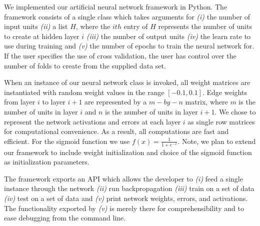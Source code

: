 We implemented our artificial neural network framework in Python.
The framework consists of a single class which takes arguments for {\em (i)} the number of input units {\em (ii)} a list \(H\), where the \(ith\) entry of \(H\) represents the number of units to create at hidden layer \(i\) {\em (iii)} the number of output units {\em (iv)} the learn rate to use during training and {\em (v)} the number of epochs to train the neural network for.
If the user specifies the use of cross validation, the user has control over the number of folds to create from the supplied data set.

When an instance of our neural network class is invoked, all weight matrices are instantiated with random weight values in the range \([-0.1,0.1]\).
Edge weights from layer \(i\) to layer \(i+1\) are represented by a \(m-by-n\) matrix, where \(m\) is the number of units in layer \(i\) and \(n\) is the number of units in layer \(i+1\).
We chose to represent the network activations and errors at each layer \(i\) as single row matrices for computational convenience.
As a result, all computations are fast and efficient.
For the sigmoid function we use \(f(x)=\frac{1}{1+e^{-x}}\).
Note, we plan to extend our framework to include weight initialization and choice of the sigmoid function as initialization parameters.

The framework exports an API which allows the developer to {\em (i)} feed a single instance through the network {\em (ii)} run backpropagation {\em (iii)} train on a set of data {\em (iv)} test on a set of data and {\em (v)} print network weights, errors, and activations.
The functionality exported by {\em (v)} is merely there for comprehensibility and to ease debugging from the command line.

